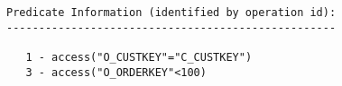 \documentclass[11pt,a4paper,parskip=half]{scrartcl}
\begin{document}
\begin{lstlisting}
Predicate Information (identified by operation id):                                                                                                                                                                                                                                                          
---------------------------------------------------                                                                                                                                                                                                                                                          
                                                                                                                                                                                                                                                                                                             
   1 - access("O_CUSTKEY"="C_CUSTKEY")                                                                                                                                                                                                                                                                       
   3 - access("O_ORDERKEY"<100)                                                                                                                                                                                                                                                                              
\end{lstlisting}
\end{document}
